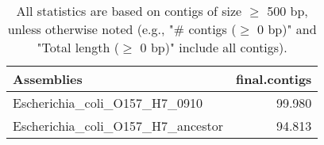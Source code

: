 \documentclass[12pt,a4paper]{article}
\begin{document}
\begin{table}[ht]
\begin{center}
\caption{All statistics are based on contigs of size $\geq$ 500 bp, unless otherwise noted (e.g., "\# contigs ($\geq$ 0 bp)" and "Total length ($\geq$ 0 bp)" include all contigs).}
\begin{tabular}{|l*{1}{|r}|}
\hline
Assemblies & final.contigs \\ \hline
Escherichia\_coli\_O157\_H7\_0910 & 99.980 \\ \hline
Escherichia\_coli\_O157\_H7\_ancestor & 94.813 \\ \hline
\end{tabular}
\end{center}
\end{table}
\end{document}
